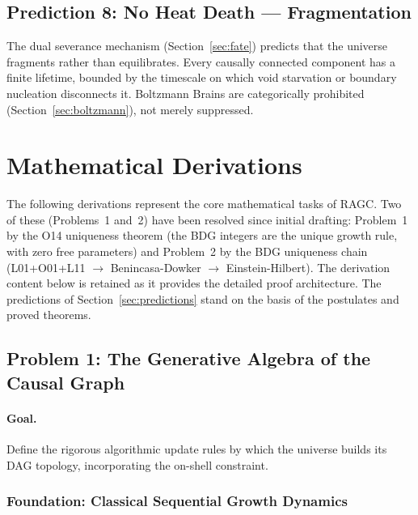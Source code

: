 \documentclass[11pt,a4paper]{article}
\theoremstyle{plain}
\theoremstyle{definition}
\theoremstyle{remark}
\begin{document}
\subsection{Prediction 8: No Heat Death --- Fragmentation}
\label{sec:pred_fate}

The dual severance mechanism (Section~\ref{sec:fate}) predicts that
the universe fragments rather than equilibrates. Every causally
connected component has a finite lifetime, bounded by the timescale
on which void starvation or boundary nucleation disconnects it.
Boltzmann Brains are categorically prohibited
(Section~\ref{sec:boltzmann}), not merely suppressed.

\section{Mathematical Derivations}
\label{sec:math}

The following derivations represent the core mathematical tasks of
RAGC. Two of these (Problems~1 and~2) have been resolved since
initial drafting: Problem~1 by the O14 uniqueness theorem (the BDG
integers are the unique growth rule, with zero free parameters) and
Problem~2 by the BDG uniqueness chain (L01+O01+L11 $\to$
Benincasa-Dowker $\to$ Einstein-Hilbert). The derivation content
below is retained as it provides the detailed proof architecture.
The predictions of Section~\ref{sec:predictions} stand on the basis of the
postulates and proved theorems.

\subsection{Problem 1: The Generative Algebra of the Causal Graph}
\label{sec:algebra}

\paragraph{Goal.} Define the rigorous algorithmic update rules by which the
universe builds its DAG topology, incorporating the on-shell constraint.

\subsubsection{Foundation: Classical Sequential Growth Dynamics}
\end{document}
